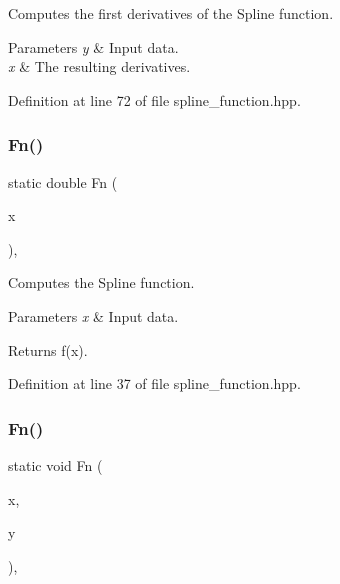Computes the first derivatives of the Spline function. 


\begin{DoxyParams}{Parameters}
{\em y} & Input data. \\
\hline
{\em x} & The resulting derivatives. \\
\hline
\end{DoxyParams}


Definition at line 72 of file spline\+\_\+function.\+hpp.

\mbox{\label{classmlpack_1_1ann_1_1SplineFunction_a11bd9a1195e6b107f9fee73643bc328b}} 
\subsubsection{Fn()\hspace{0.1cm}{\footnotesize\ttfamily [1/2]}}
{\footnotesize\ttfamily static double Fn (\begin{DoxyParamCaption}\item[{const double}]{x }\end{DoxyParamCaption})\hspace{0.3cm}{\ttfamily [inline]}, {\ttfamily [static]}}



Computes the Spline function. 


\begin{DoxyParams}{Parameters}
{\em x} & Input data. \\
\hline
\end{DoxyParams}
\begin{DoxyReturn}{Returns}
f(x). 
\end{DoxyReturn}


Definition at line 37 of file spline\+\_\+function.\+hpp.

\mbox{\label{classmlpack_1_1ann_1_1SplineFunction_af6cf5da90eb6312e3e25c9b8bd9c3527}} 
\subsubsection{Fn()\hspace{0.1cm}{\footnotesize\ttfamily [2/2]}}
{\footnotesize\ttfamily static void Fn (\begin{DoxyParamCaption}\item[{const Input\+Vec\+Type \&}]{x,  }\item[{Output\+Vec\+Type \&}]{y }\end{DoxyParamCaption})\hspace{0.3cm}{\ttfamily [inline]}, {\ttfamily [static]}}



